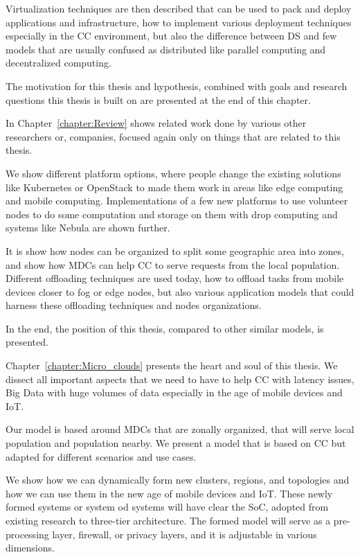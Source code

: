 Virtualization techniques are then described that can be used to pack and deploy applications and infrastructure, how to implement various deployment techniques especially in the CC environment, but also the difference between DS and few models that are usually confused as distributed like parallel computing and decentralized computing.

The motivation for this thesis and hypothesis, combined with goals and research questions this thesis is built on are presented at the end of this chapter.

In Chapter~\ref{chapter:Review} shows related work done by various other researchers or, companies, focused again only on things that are related to this thesis.

We show different platform options, where people change the existing solutions like Kubernetes or OpenStack to made them work in areas like edge computing and mobile computing. Implementations of a few new platforms to use volunteer nodes to do some computation and storage on them with drop computing and systems like Nebula are shown further.

It is show how nodes can be organized to split some geographic area into zones, and show how MDCs can help CC to serve requests from the local population. Different offloading techniques are used today, how to offload tasks from mobile devices closer to fog or edge nodes, but also various application models that could harness these offloading techniques and nodes organizations.

In the end, the position of this thesis, compared to other similar models, is presented.

Chapter~\ref{chapter:Micro_clouds} presents the heart and soul of this thesis. We dissect all important aspects that we need to have to help CC with latency issues, Big Data with huge volumes of data especially in the age of mobile devices and IoT.

Our model is based around MDCs that are zonally organized, that will serve local population and population nearby. We present a model that is based on CC but adapted for different scenarios and use cases.

We show how we can dynamically form new clusters, regions, and topologies and how we can use them in the new age of mobile devices and IoT. These newly formed systems or system od systems will have clear the SoC, adopted from existing research to three-tier architecture. The formed model will serve as a pre-processing layer, firewall, or privacy layers, and it is adjustable in various dimensions.


